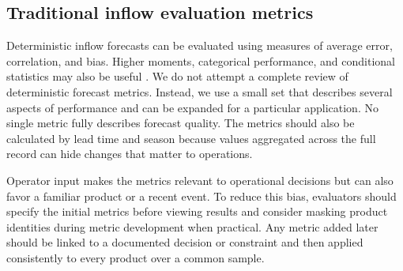 \documentclass[MLA]{USG} %
\begin{document}
\subsection{Traditional inflow evaluation metrics}

Deterministic inflow forecasts can be evaluated using measures of average error, correlation, and bias. Higher moments, categorical performance, and conditional statistics may also be useful \citep{st-aubinPrecisionReliabilityForecasts2022,hewamalageForecastEvaluationData2023}. We do not attempt a complete review of deterministic forecast metrics. Instead, we use a small set that describes several aspects of performance and can be expanded for a particular application. No single metric fully describes forecast quality. The metrics should also be calculated by lead time and season because values aggregated across the full record can hide changes that matter to operations.

Operator input makes the metrics relevant to operational decisions but can also favor a familiar product or a recent event. To reduce this bias, evaluators should specify the initial metrics before viewing results and consider masking product identities during metric development when practical. Any metric added later should be linked to a documented decision or constraint and then applied consistently to every product over a common sample.
\end{document}

